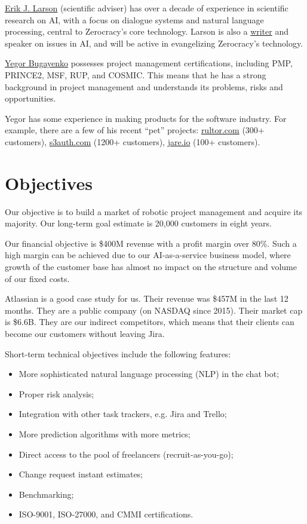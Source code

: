 \documentclass{main}
\begin{document}
\href{https://www.linkedin.com/in/erik-larson-b287ba9}{Erik J. Larson} (scientific adviser) has over a decade of experience in
scientific research on AI, with a focus on dialogue systems and natural language
processing, central to Zerocracy's core technology. Larson is also a
\href{https://www.theatlantic.com/technology/archive/2015/05/the-humanists-paradox/391622/}{writer} and
speaker on issues in AI, and will be active in evangelizing Zerocracy's
technology.

\href{http://www.yegor256.com/about-me.html}{Yegor Bugayenko} possesses project management certifications, including PMP,
PRINCE2, MSF, RUP, and COSMIC. This means that he has a strong background in
project management and understands its problems, risks and opportunities.

Yegor has some experience in making products for the software industry. For example,
there are a few of his recent ``pet'' projects:
\href{https://www.rultor.com}{rultor.com} (300+ customers),
\href{http://www.s3auth.com}{s3auth.com} (1200+ customers),
\href{http://www.jare.io}{jare.io} (100+ customers).


\section{Objectives}

Our objective is to build a market of robotic project management and acquire its
majority. Our long-term goal estimate is 20,000 customers in eight years.

Our financial objective is \$400M revenue with a profit margin over 80\%. Such a high
margin can be achieved due to our AI-as-a-service business model, where growth
of the customer base has almost no impact on the structure and volume of our
fixed costs.

Atlassian is a good case study for us. Their revenue was \$457M in the last 12
months. They are a public company (on NASDAQ since 2015). Their market cap is
\$6.6B. They are our indirect competitors, which means that their clients can
become our customers without leaving Jira.

Short-term technical objectives include the following features:

\begin{itemize}\itemsep0em
  \item More sophisticated natural language processing (NLP) in the chat bot;
  \item Proper risk analysis;
  \item Integration with other task trackers, e.g. Jira and Trello;
  \item More prediction algorithms with more metrics;
  \item Direct access to the pool of freelancers (recruit-as-you-go);
  \item Change request instant estimates;
  \item Benchmarking;
  \item ISO-9001, ISO-27000, and CMMI certifications.
\end{itemize}
\end{document}
